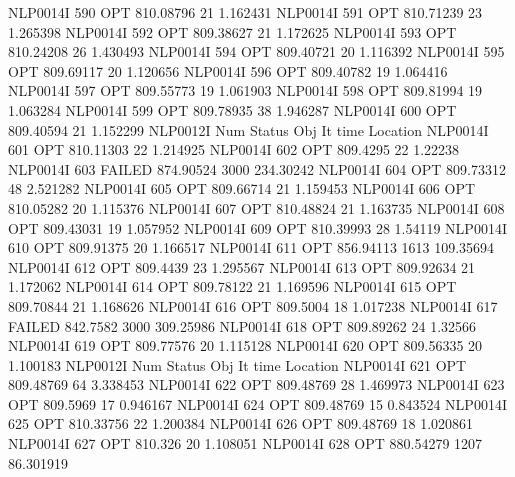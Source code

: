 NLP0014I           590         OPT 810.08796       21 1.162431
NLP0014I           591         OPT 810.71239       23 1.265398
NLP0014I           592         OPT 809.38627       21 1.172625
NLP0014I           593         OPT 810.24208       26 1.430493
NLP0014I           594         OPT 809.40721       20 1.116392
NLP0014I           595         OPT 809.69117       20 1.120656
NLP0014I           596         OPT 809.40782       19 1.064416
NLP0014I           597         OPT 809.55773       19 1.061903
NLP0014I           598         OPT 809.81994       19 1.063284
NLP0014I           599         OPT 809.78935       38 1.946287
NLP0014I           600         OPT 809.40594       21 1.152299
NLP0012I 
              Num      Status      Obj             It       time                 Location
NLP0014I           601         OPT 810.11303       22 1.214925
NLP0014I           602         OPT 809.4295       22 1.22238
NLP0014I           603      FAILED 874.90524     3000 234.30242
NLP0014I           604         OPT 809.73312       48 2.521282
NLP0014I           605         OPT 809.66714       21 1.159453
NLP0014I           606         OPT 810.05282       20 1.115376
NLP0014I           607         OPT 810.48824       21 1.163735
NLP0014I           608         OPT 809.43031       19 1.057952
NLP0014I           609         OPT 810.39993       28 1.54119
NLP0014I           610         OPT 809.91375       20 1.166517
NLP0014I           611         OPT 856.94113     1613 109.35694
NLP0014I           612         OPT 809.4439       23 1.295567
NLP0014I           613         OPT 809.92634       21 1.172062
NLP0014I           614         OPT 809.78122       21 1.169596
NLP0014I           615         OPT 809.70844       21 1.168626
NLP0014I           616         OPT 809.5004       18 1.017238
NLP0014I           617      FAILED 842.7582     3000 309.25986
NLP0014I           618         OPT 809.89262       24 1.32566
NLP0014I           619         OPT 809.77576       20 1.115128
NLP0014I           620         OPT 809.56335       20 1.100183
NLP0012I 
              Num      Status      Obj             It       time                 Location
NLP0014I           621         OPT 809.48769       64 3.338453
NLP0014I           622         OPT 809.48769       28 1.469973
NLP0014I           623         OPT 809.5969       17 0.946167
NLP0014I           624         OPT 809.48769       15 0.843524
NLP0014I           625         OPT 810.33756       22 1.200384
NLP0014I           626         OPT 809.48769       18 1.020861
NLP0014I           627         OPT 810.326       20 1.108051
NLP0014I           628         OPT 880.54279     1207 86.301919

